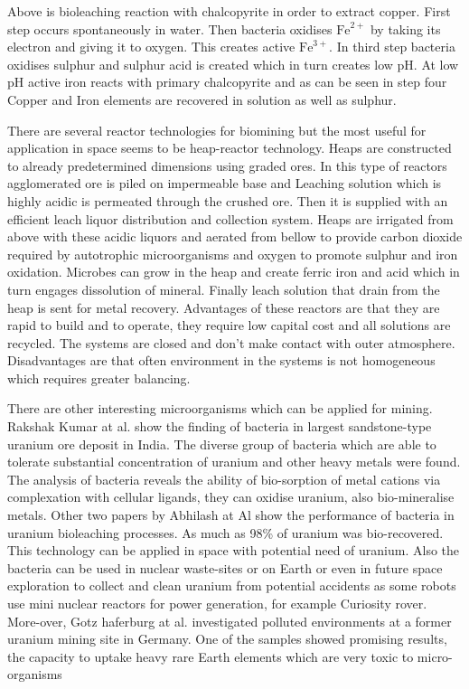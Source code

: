 \documentclass[12pt]{article}
\begin{document}

Above is bioleaching reaction with chalcopyrite in order to extract copper. First step occurs spontaneously in water. Then bacteria oxidises $\mathrm{Fe}^{2+}$ by taking its electron and giving it to
oxygen. This creates active $\mathrm{Fe}^{3+}$. In third step bacteria oxidises sulphur and sulphur acid is created which in turn creates low pH. At low pH active iron reacts with primary chalcopyrite and as can be seen in step four Copper and Iron elements are recovered in solution as well as sulphur.


There are several reactor technologies for biomining but the most useful for application in space seems to be heap-reactor technology. Heaps are constructed to already predetermined dimensions using graded ores. In this type of reactors agglomerated ore is piled on impermeable base and Leaching solution which is highly acidic is permeated through the crushed ore. Then it is supplied with an efficient leach liquor distribution and collection system. Heaps are irrigated
from above with these acidic liquors and aerated from bellow to provide carbon dioxide required by autotrophic microorganisms and oxygen to promote sulphur and iron oxidation. Microbes can grow in the heap and create ferric iron and acid which in turn engages dissolution of mineral.\cite{} Finally leach solution that drain from the heap is sent for metal recovery. Advantages of these reactors are that they are rapid to build and to operate, they require low capital cost and all solutions are recycled. The systems are closed and don’t make contact with
outer atmosphere. Disadvantages are that often environment in the systems is not homogeneous which requires greater balancing.

\todo

There are other interesting microorganisms which can be applied for mining. Rakshak Kumar at al. show the finding of bacteria in largest sandstone-type uranium ore deposit in India.\cite{} The diverse group of bacteria which are able to tolerate substantial concentration of uranium and other heavy metals were found. The analysis of bacteria reveals the ability of bio-sorption of
metal cations via complexation with cellular ligands, they can oxidise uranium, also bio-mineralise metals. Other two papers by Abhilash at Al show the performance of bacteria in uranium bioleaching processes. As much as 98\% of uranium was bio-recovered. This technology can be applied in space with potential need of uranium. Also the bacteria can be used in nuclear waste-sites or on Earth or even in future space exploration to collect and clean
uranium from potential accidents as some robots use mini nuclear reactors for power generation, for example Curiosity rover. More-over, Gotz haferburg at al. investigated polluted environments at a former uranium mining site in Germany. One of the samples showed promising results, the capacity to uptake heavy rare Earth elements which are very toxic to micro-organisms
\end{document}
